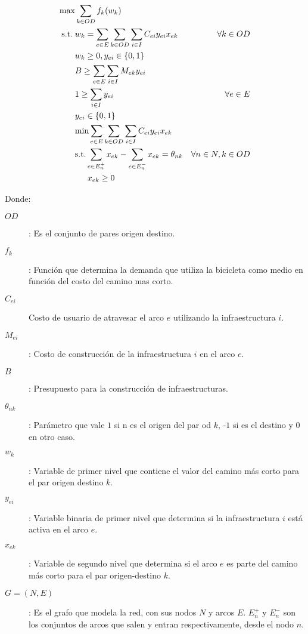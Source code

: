 \documentclass{article}
\begin{document}
  \begin{align}
    \text{max}    & \sum_{k \in OD} f_k(w_k)                                                         & \label{eq:objective1lvl} \\
    \text{s.t.}\; & w_k = \sum_{e \in E} \sum_{k \in OD} \sum_{i \in I} C_{ei}y_{ei}x_{ek}           & \forall k \in OD \label{eq:shortestpath} \\
                  & w_k \geq 0, y_{ei} \in \left\{ 0, 1 \right\}                                     & \nonumber \\
                  & B \geq \sum_{e \in E} \sum_{i \in I} M_{ek}y_{ei}                                & \label{eq:respectbudget} \\
                  & 1 \geq \sum_{i \in I} y_{ei}                                                     & \forall e \in E \label{eq:atmostoney} \\
                  & y_{ei} \in \left\{0, 1\right\}                                                   & \nonumber \\
                  & \text{min} \sum_{e \in E} \sum_{k \in OD} \sum_{i \in I} C_{ei}y_{ei}x_{ek}      & \label{eq:subproblem} \\
                  & \text{s.t.} \sum_{e \in E_n^+} x_{ek} - \sum_{e \in E_n^-} x_{ek} = \theta_{nk}  & \forall n \in N, k \in OD \label {eq:flowbalance} \\
                  & \hspace{1.5em} x_{ek} \geq 0  & \nonumber
  \end{align}

  Donde:

  \begin{description}
    \item[$OD$]: Es el conjunto de pares origen destino.
    \item[$f_k$]: Función que determina la demanda que utiliza la bicicleta como medio en función del costo del camino mas corto.
    \item[$C_{ei}$] Costo de usuario de atravesar el arco $e$ utilizando la infraestructura $i$.
    \item[$M_{ei}$]: Costo de construcción de la infraestructura $i$ en el arco $e$.
    \item[$B$]: Presupuesto para la construcción de infraestructuras.
    \item[$\theta_{nk}$]: Parámetro que vale $1$ si n es el origen del par od $k$, -$1$ si es el destino y $0$ en otro caso.
    \item[$w_k$]: Variable de primer nivel que contiene el valor del camino más corto para el par origen destino $k$.
    \item[$y_{ei}$]: Variable binaria de primer nivel que determina si la infraestructura $i$ está activa en el arco $e$.
    \item[$x_{ek}$]: Variable de segundo nivel que determina si el arco $e$ es parte del camino más corto para el par origen-destino $k$.
    \item[$G=(N,E)$]: Es el grafo que modela la red, con sus nodos $N$ y arcos $E$. $E_n^+$ y $E_n^-$ son los conjuntos de arcos que salen y entran respectivamente, desde el nodo $n$.
  \end{description}
\end{document}
